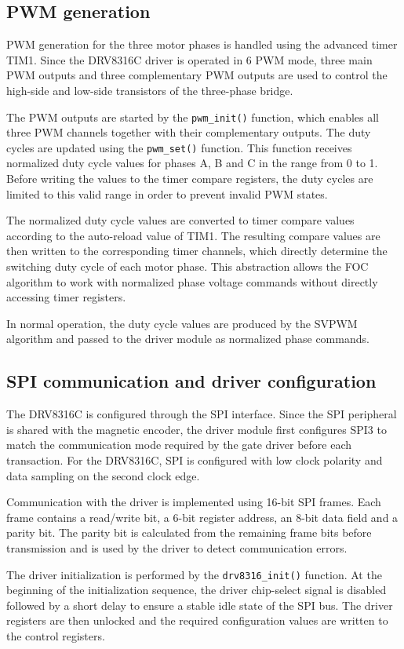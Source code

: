 \subsection{PWM generation}
PWM generation for the three motor phases is handled using the advanced timer TIM1.
Since the DRV8316C driver is operated in 6 PWM mode, three main PWM outputs and three complementary
PWM outputs are used to control the high-side and low-side transistors of the three-phase bridge.

The PWM outputs are started by the \texttt{pwm\_init()} function, which enables all three PWM channels together with their complementary outputs.
The duty cycles are updated using the \texttt{pwm\_set()} function. This function receives normalized duty cycle values for phases A, B and C
in the range from 0 to 1.
Before writing the values to the timer compare registers, the duty cycles are limited to this valid range in order to prevent invalid PWM states.

The normalized duty cycle values are converted to timer compare values according to the auto-reload value of TIM1.
The resulting compare values are then written to the corresponding timer channels, 
which directly determine the switching duty cycle of each motor phase.
This abstraction allows the FOC algorithm to work with normalized phase voltage commands without directly accessing timer registers.

In normal operation, the duty cycle values are produced by the SVPWM algorithm and passed to the driver module as normalized phase commands.

\subsection{SPI communication and driver configuration}
The DRV8316C is configured through the SPI interface. 
Since the SPI peripheral is shared with the magnetic encoder, the driver module first configures SPI3
to match the communication mode required by the gate driver before each transaction. 
For the DRV8316C, SPI is configured with low clock polarity and data sampling on the second clock edge.

Communication with the driver is implemented using 16-bit SPI frames. 
Each frame contains a read/write bit, a 6-bit register address, an 8-bit data field and a parity bit. 
The parity bit is calculated from the remaining frame bits before transmission and is used by the driver to detect communication errors. 

The driver initialization is performed by the \texttt{drv8316\_init()} function. 
At the beginning of the initialization sequence, the driver chip-select signal is disabled 
followed by a short delay to ensure a stable idle state of the SPI bus. 
The driver registers are then unlocked and the required configuration values are written to the control registers.

